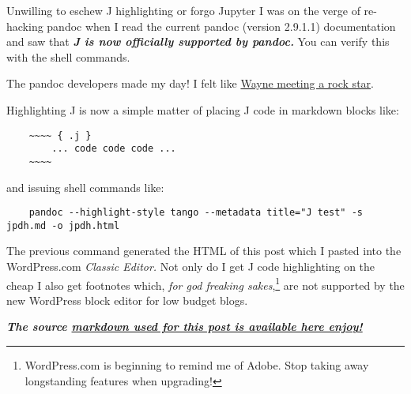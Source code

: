 Unwilling to eschew J highlighting or forgo Jupyter I was on the verge
of re-hacking pandoc when I read the current pandoc (version 2.9.1.1)
documentation and saw that \textbf{\emph{J is now officially supported
by pandoc.}} You can verify this with the shell commands.

The pandoc developers made my day! I felt like
\href{https://www.youtube.com/watch?v=lBEn3a4TIUw}{Wayne meeting a rock
star}.

Highlighting J is now a simple matter of placing J code in markdown
blocks like:

\begin{verbatim}
    ~~~~ { .j }
        ... code code code ...
    ~~~~
\end{verbatim}

and issuing shell commands like:


\begin{verbatim}
    pandoc --highlight-style tango --metadata title="J test" -s jpdh.md -o jpdh.html
\end{verbatim}


The previous command generated the HTML of this post which I pasted into
the WordPress.com \emph{Classic Editor.} Not only do I get J code
highlighting on the cheap I also get footnotes which, \emph{for god
freaking sakes},\footnote{WordPress.com is beginning to remind me of Adobe. Stop taking away
 longstanding features when upgrading!
} are not
supported by the new WordPress block editor for low budget blogs.

\medskip

\textbf{\emph{The source \href{https://github.com/bakerjd99/jacks/tree/master/pandocexamples}{markdown used for this post is available here enjoy!}}}


